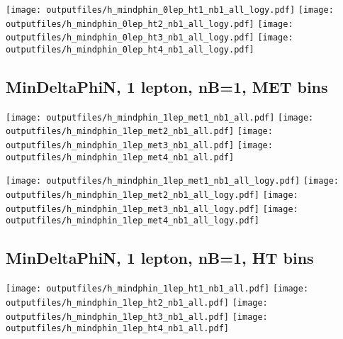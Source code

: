 \documentclass[11pt]{article}
\begin{document}
    \noindent
     \texttt{[image: outputfiles/h\_mindphin\_0lep\_ht1\_nb1\_all\_logy.pdf]}
     \texttt{[image: outputfiles/h\_mindphin\_0lep\_ht2\_nb1\_all\_logy.pdf]}
     \texttt{[image: outputfiles/h\_mindphin\_0lep\_ht3\_nb1\_all\_logy.pdf]}
     \texttt{[image: outputfiles/h\_mindphin\_0lep\_ht4\_nb1\_all\_logy.pdf]}

    \clearpage




    \subsection{ MinDeltaPhiN, 1 lepton, nB=1, MET bins }

    \noindent
     \texttt{[image: outputfiles/h\_mindphin\_1lep\_met1\_nb1\_all.pdf]}
     \texttt{[image: outputfiles/h\_mindphin\_1lep\_met2\_nb1\_all.pdf]}
     \texttt{[image: outputfiles/h\_mindphin\_1lep\_met3\_nb1\_all.pdf]}
     \texttt{[image: outputfiles/h\_mindphin\_1lep\_met4\_nb1\_all.pdf]}

    \noindent
     \texttt{[image: outputfiles/h\_mindphin\_1lep\_met1\_nb1\_all\_logy.pdf]}
     \texttt{[image: outputfiles/h\_mindphin\_1lep\_met2\_nb1\_all\_logy.pdf]}
     \texttt{[image: outputfiles/h\_mindphin\_1lep\_met3\_nb1\_all\_logy.pdf]}
     \texttt{[image: outputfiles/h\_mindphin\_1lep\_met4\_nb1\_all\_logy.pdf]}

    \clearpage






    \subsection{ MinDeltaPhiN, 1 lepton, nB=1, HT bins }

    \noindent
     \texttt{[image: outputfiles/h\_mindphin\_1lep\_ht1\_nb1\_all.pdf]}
     \texttt{[image: outputfiles/h\_mindphin\_1lep\_ht2\_nb1\_all.pdf]}
     \texttt{[image: outputfiles/h\_mindphin\_1lep\_ht3\_nb1\_all.pdf]}
     \texttt{[image: outputfiles/h\_mindphin\_1lep\_ht4\_nb1\_all.pdf]}
\end{document}
